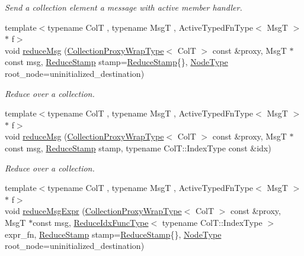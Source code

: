 \begin{DoxyCompactItemize}
\begin{DoxyCompactList}\small\item\em Send a collection element a message with active member handler. \end{DoxyCompactList}\item 
{\footnotesize template$<$typename ColT , typename MsgT , Active\+Typed\+Fn\+Type$<$ Msg\+T $>$ $\ast$ f$>$ }\\void \hyperlink{structvt_1_1vrt_1_1collection_1_1_collection_manager_a73e0a7bd12d524cb1d723fb1dc13ffe2}{reduce\+Msg} (\hyperlink{structvt_1_1vrt_1_1collection_1_1_collection_manager_a56458ed7f9bb22b631b9b3a745f42f94}{Collection\+Proxy\+Wrap\+Type}$<$ ColT $>$ const \&proxy, MsgT $\ast$const msg, \hyperlink{structvt_1_1vrt_1_1collection_1_1_collection_manager_ae8aac19e0ae07e9225142e5880eac830}{Reduce\+Stamp} stamp=\hyperlink{structvt_1_1vrt_1_1collection_1_1_collection_manager_ae8aac19e0ae07e9225142e5880eac830}{Reduce\+Stamp}\{\}, \hyperlink{namespacevt_a866da9d0efc19c0a1ce79e9e492f47e2}{Node\+Type} root\+\_\+node=uninitialized\+\_\+destination)
\begin{DoxyCompactList}\small\item\em Reduce over a collection. \end{DoxyCompactList}\item 
{\footnotesize template$<$typename ColT , typename MsgT , Active\+Typed\+Fn\+Type$<$ Msg\+T $>$ $\ast$ f$>$ }\\void \hyperlink{structvt_1_1vrt_1_1collection_1_1_collection_manager_a6a8a316325bb35ed2a88a4c2491f2e0f}{reduce\+Msg} (\hyperlink{structvt_1_1vrt_1_1collection_1_1_collection_manager_a56458ed7f9bb22b631b9b3a745f42f94}{Collection\+Proxy\+Wrap\+Type}$<$ ColT $>$ const \&proxy, MsgT $\ast$const msg, \hyperlink{structvt_1_1vrt_1_1collection_1_1_collection_manager_ae8aac19e0ae07e9225142e5880eac830}{Reduce\+Stamp} stamp, typename Col\+T\+::\+Index\+Type const \&idx)
\begin{DoxyCompactList}\small\item\em Reduce over a collection. \end{DoxyCompactList}\item 
{\footnotesize template$<$typename ColT , typename MsgT , Active\+Typed\+Fn\+Type$<$ Msg\+T $>$ $\ast$ f$>$ }\\void \hyperlink{structvt_1_1vrt_1_1collection_1_1_collection_manager_a85d90217d51ccc12021acd6d6f6da4c0}{reduce\+Msg\+Expr} (\hyperlink{structvt_1_1vrt_1_1collection_1_1_collection_manager_a56458ed7f9bb22b631b9b3a745f42f94}{Collection\+Proxy\+Wrap\+Type}$<$ ColT $>$ const \&proxy, MsgT $\ast$const msg, \hyperlink{structvt_1_1vrt_1_1collection_1_1_collection_manager_a47a3227ae0195c15187e8dc8762f66c4}{Reduce\+Idx\+Func\+Type}$<$ typename Col\+T\+::\+Index\+Type $>$ expr\+\_\+fn, \hyperlink{structvt_1_1vrt_1_1collection_1_1_collection_manager_ae8aac19e0ae07e9225142e5880eac830}{Reduce\+Stamp} stamp=\hyperlink{structvt_1_1vrt_1_1collection_1_1_collection_manager_ae8aac19e0ae07e9225142e5880eac830}{Reduce\+Stamp}\{\}, \hyperlink{namespacevt_a866da9d0efc19c0a1ce79e9e492f47e2}{Node\+Type} root\+\_\+node=uninitialized\+\_\+destination)

\end{DoxyCompactItemize}
